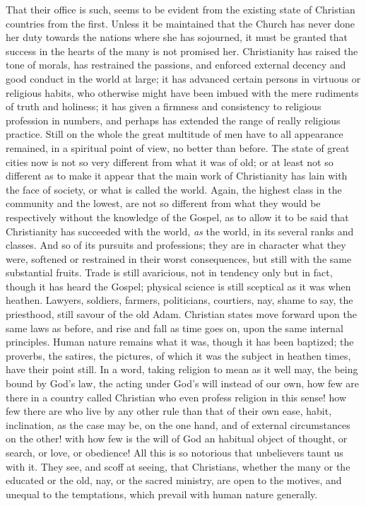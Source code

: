 That their office is such, seems to be evident from the existing
state of Christian countries from the first. Unless it be maintained
that the Church has never done her duty towards the nations where she
has sojourned, it must be granted that success in the hearts of the
many is not promised her. Christianity has raised the tone of morals,
has restrained the passions, and enforced external decency and good
conduct in the world at large; it has advanced certain persons in
virtuous or religious habits, who otherwise might have been imbued
with the mere rudiments of truth and holiness; it has given a firmness
and consistency to religious profession in numbers, and perhaps has
extended the range of really religious practice. Still on the whole
the great multitude of men have to all appearance remained, in a
spiritual point of view, no better than before. The state of great
cities now is not so very different from what it was of old; or at
least not so different as to make it appear that the main work of
Christianity has lain with the face of society, or what is called the
world. Again, the highest class in the community and the lowest, are
not so different from what they would be respectively without the
knowledge of the Gospel, as to allow it to be said that Christianity
has succeeded with the world, \emph{as} the world, in its several
ranks and classes. And so of its pursuits and professions; they are in
character what they were, softened or restrained in their worst
consequences, but still with the same substantial fruits. Trade is
still avaricious, not in tendency only but in fact, though it has
heard the Gospel; physical science is still sceptical as it was when
heathen. Lawyers, soldiers, farmers, politicians, courtiers, nay,
shame to say, the priesthood, still savour of the old Adam. Christian
states move forward upon the same laws as before, and rise and fall as
time goes on, upon the same internal principles. Human nature remains
what it was, though it has been baptized; the proverbs, the satires,
the pictures, of which it was the subject in heathen times, have their
point still. In a word, taking religion to mean as it well may, the
being bound by God's law, the acting under God's will instead of our
own, how few are there in a country called Christian who even profess
religion in this sense! how few there are who live by any other rule
than that of their own ease, habit, inclination, as the case may be,
on the one hand, and of external circumstances on the other! with how
few is the will of God an habitual object of thought, or search, or
love, or obedience! All this is so notorious that unbelievers taunt us
with it. They see, and scoff at seeing, that Christians, whether the
many or the educated or the old, nay, or the sacred ministry, are open
to the motives, and unequal to the temptations, which prevail with
human nature generally.


